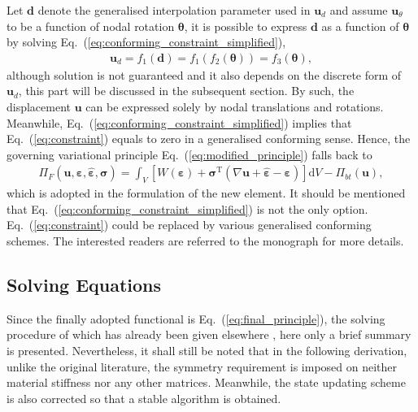 \documentclass[3p,sort&compress,review,11pt]{elsarticle}
\newcommand*{\md}[1]{\mathrm{d}#1}
\newcommand*{\mT}{\mathrm{T}}
\newcommand*{\eqsref}[1]{Eq.~(\ref{#1})}
\newcommand*{\mb}{\bm}
\begin{document}
Let $\mb{d}$ denote the generalised interpolation parameter used in $\mb{u}_d$ and assume $\mb{u}_\theta$ to be a function of nodal rotation $\mb{\theta}$, it is possible to express $\mb{d}$ as a function of $\mb{\theta}$ by solving \eqsref{eq:conforming_constraint_simplified},
\begin{gather*}
\mb{u}_d=f_1\left(\mb{d}\right)=f_1\left(f_2\left(\mb{\theta}\right)\right)=f_3\left(\mb{\theta}\right),
\end{gather*}
although solution is not guaranteed and it also depends on the discrete form of $\mb{u}_d$, this part will be discussed in the subsequent section. By such, the displacement $\mb{u}$ can be expressed solely by nodal translations and rotations. Meanwhile, \eqsref{eq:conforming_constraint_simplified} implies that \eqsref{eq:constraint} equals to zero in a generalised conforming sense. Hence, the governing variational principle \eqsref{eq:modified_principle} falls back to
\begin{gather}\label{eq:final_principle}
\varPi_F\left(\mb{u},\mb{\varepsilon},\hat{\mb{\varepsilon}},\mb{\sigma}\right)=\int_V\left[W\left(\mb{\varepsilon}\right)+\mb{\sigma}^\mT\left(\nabla\mb{u}+\hat{\mb{\varepsilon}}-\mb{\varepsilon}\right)\right]\md{V}-\varPi_{bt}\left(\mb{u}\right),
\end{gather}
which is adopted in the formulation of the new element. It should be mentioned that \eqsref{eq:conforming_constraint_simplified} is not the only option. \eqsref{eq:constraint} could be replaced by various generalised conforming schemes. The interested readers are referred to the monograph \citep{Long2009} for more details.
\subsection{Solving Equations}
Since the finally adopted functional is \eqsref{eq:final_principle}, the solving procedure of which has already been given elsewhere \citep{Piltner1995,Piltner1999}, here only a brief summary is presented. Nevertheless, it shall still be noted that in the following derivation, unlike the original literature, the symmetry requirement is imposed on neither material stiffness nor any other matrices. Meanwhile, the state updating scheme is also corrected so that a stable algorithm is obtained.
\end{document}
